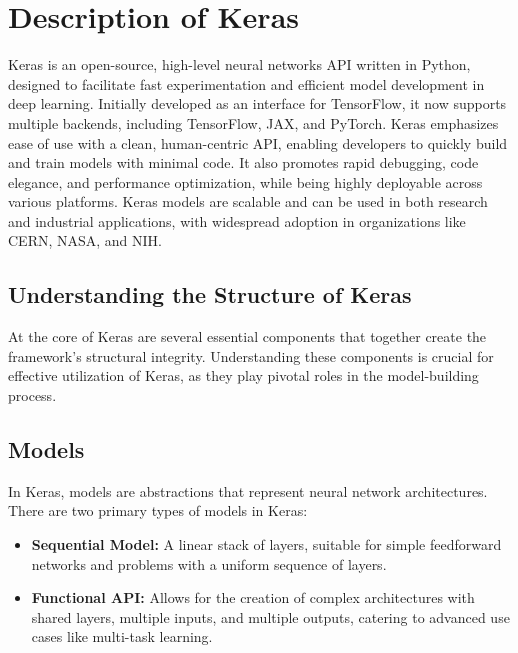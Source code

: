 \section*{Description of Keras}
	Keras is an open-source, high-level neural networks API written in Python, designed to facilitate fast experimentation and efficient model development in deep learning. Initially developed as an interface for TensorFlow, it now supports multiple backends, including TensorFlow, JAX, and PyTorch. Keras emphasizes ease of use with a clean, human-centric API, enabling developers to quickly build and train models with minimal code. It also promotes rapid debugging, code elegance, and performance optimization, while being highly deployable across various platforms. Keras models are scalable and can be used in both research and industrial applications, with widespread adoption in organizations like CERN, NASA, and NIH.\cite{Jsaer:2024}
	
	\subsection*{Understanding the Structure of Keras}
	At the core of Keras are several essential components that together create the framework’s structural integrity. Understanding these components is crucial for effective utilization of Keras, as they play pivotal roles in the model-building process.\cite{Jsaer:2024}
	
	\subsection*{Models}
	In Keras, models are abstractions that represent neural network architectures. There are two primary types of models in Keras:
	\begin{itemize}
		\item \textbf{Sequential Model:} A linear stack of layers, suitable for simple feedforward networks and problems with a uniform sequence of layers.
		\item \textbf{Functional API:} Allows for the creation of complex architectures with shared layers, multiple inputs, and multiple outputs, catering to advanced use cases like multi-task learning.\cite{Keras:2024}
	\end{itemize}
	
